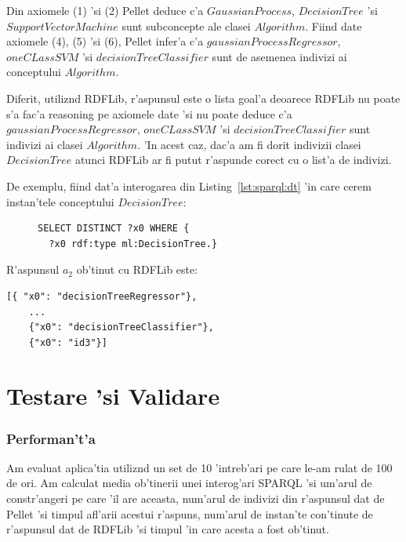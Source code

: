 \documentclass[12pt,a4paper,twoside]{report}
\begin{document}
Din axiomele (1) 'si (2) Pellet deduce c'a $GaussianProcess$, $DecisionTree$ 'si $SupportVectorMachine$ sunt subconcepte ale clasei $Algorithm$. Fiind date axiomele (4), (5) 'si (6), Pellet infer'a c'a $gaussianProcessRegressor$, $oneCLassSVM$ 'si $decisionTreeClassifier$ sunt de asemenea indivizi ai conceptului $Algorithm$. 

Diferit, utiliz\ia nd RDFLib, r'aspunsul este o lista goal'a deoarece RDFLib nu poate s'a fac'a reasoning pe axiomele date 'si nu poate deduce c'a $gaussianProcessRegressor$, $oneCLassSVM$ 'si $decisionTreeClassifier$ sunt indivizi ai clasei $Algorithm$. 
'In acest caz, dac'a am fi dorit indivizii clasei $DecisionTree$ atunci RDFLib ar fi putut r'aspunde corect cu o list'a de indivizi.

De exemplu, fiind dat'a interogarea din Listing~\ref{lst:sparql:dt} 'in care cerem instan'tele conceptului $DecisionTree$:


\begin{figure}[h]
\begin{footnotesize}
\begin{lstlisting}[captionpos=b, caption=Interogare SPARQL pentru ob'tinerea indivizilor clasei $DecisionTree$, label=lst:sparql:dt,
   basicstyle=\ttfamily,frame=single]
SELECT DISTINCT ?x0 WHERE {
  ?x0 rdf:type ml:DecisionTree.}
\end{lstlisting}
\end{footnotesize}
\end{figure}

R'aspunsul $a_2$ ob'tinut cu RDFLib este:

\begin{center}
\begin{lstlisting}[basicstyle=\footnotesize]
    [{ "x0": "decisionTreeRegressor"}, 
    ...
    {"x0": "decisionTreeClassifier"}, 
    {"x0": "id3"}]
\end{lstlisting}
\end{center}
\chapter{Testare 'si Validare}

\subsection{Performan't'a}

Am evaluat aplica'tia utiliz\ia nd un set de 10 'intreb'ari pe care le-am rulat de 100 de ori. Am calculat media ob'tinerii unei interog'ari SPARQL 'si um'arul de constr'angeri pe care 'il are aceasta, num'arul de indivizi din r'aspunsul dat de Pellet 'si timpul afl'arii acestui r'aspuns, num'arul de instan'te con'tinute de r'aspunsul dat de RDFLib 'si timpul 'in care acesta a fost ob'tinut. 
\end{document}
